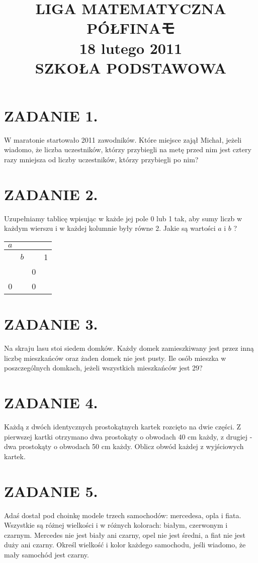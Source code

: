 \documentclass[10pt]{article}
\title{LIGA MATEMATYCZNA PÓŁFINAモ \\
 18 lutego 2011 \\
 SZKOŁA PODSTAWOWA }
\author{}
\date{}
\begin{document}
\maketitle
\section*{ZADANIE 1.}
W maratonie startowało 2011 zawodników. Które miejsce zajął Michał, jeżeli wiadomo, że liczba uczestników, którzy przybiegli na metę przed nim jest cztery razy mniejsza od liczby uczestników, którzy przybiegli po nim?

\section*{ZADANIE 2.}
Uzupełniamy tablicę wpisując w każde jej pole 0 lub 1 tak, aby sumy liczb w każdym wierszu i w każdej kolumnie były równe 2. Jakie są wartości \(a\) i \(b\) ?

\begin{center}
\begin{tabular}{|c|c|c|c|}
\hline
\(a\) &  &  &  \\
\hline
 & \(b\) &  & 1 \\
\hline
 &  & 0 &  \\
\hline
0 &  & 0 &  \\
\hline
\end{tabular}
\end{center}

\section*{ZADANIE 3.}
Na skraju lasu stoi siedem domków. Każdy domek zamieszkiwany jest przez inną liczbę mieszkańców oraz żaden domek nie jest pusty. Ile osób mieszka w poszczególnych domkach, jeżeli wszystkich mieszkańców jest 29?

\section*{ZADANIE 4.}
Każdą z dwóch identycznych prostokątnych kartek rozcięto na dwie części. Z pierwszej kartki otrzymano dwa prostokąty o obwodach 40 cm każdy, z drugiej - dwa prostokąty o obwodach 50 cm każdy. Oblicz obwód każdej z wyjściowych kartek.

\section*{ZADANIE 5.}
Adaś dostał pod choinkę modele trzech samochodów: mercedesa, opla i fiata. Wszystkie są różnej wielkości i w różnych kolorach: białym, czerwonym i czarnym. Mercedes nie jest biały ani czarny, opel nie jest średni, a fiat nie jest duży ani czarny. Określ wielkość i kolor każdego samochodu, jeśli wiadomo, że mały samochód jest czarny.
\end{document}
